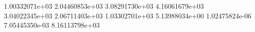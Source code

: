  1.00332071e+03
 2.04460853e+03
 3.08291730e+03
 4.16061679e+03
 3.04022345e+03
 2.06711403e+03
 1.03302701e+03
 5.13988034e+00
 1.02475824e-06
 7.05445350e-03
 8.16113798e+03
